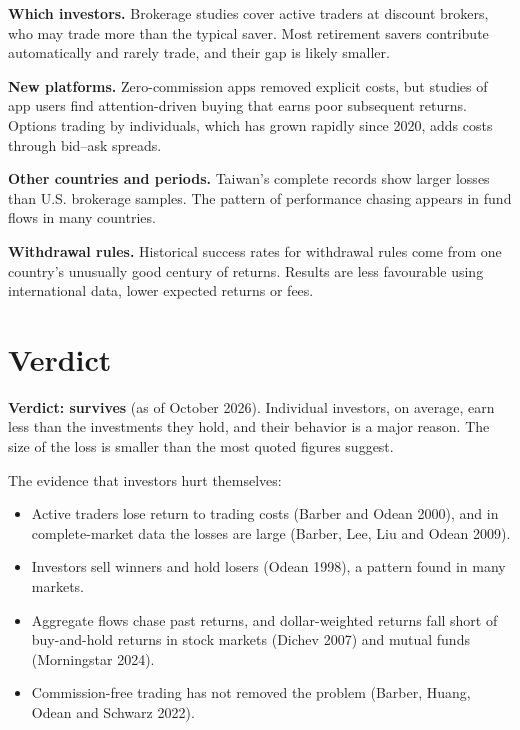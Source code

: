 \textbf{Which investors.} Brokerage studies cover active traders at discount brokers, who may trade more than the typical saver. Most retirement savers contribute automatically and rarely trade, and their gap is likely smaller.

\textbf{New platforms.} Zero-commission apps removed explicit costs, but studies of app users find attention-driven buying that earns poor subsequent returns. Options trading by individuals, which has grown rapidly since 2020, adds costs through bid--ask spreads.

\textbf{Other countries and periods.} Taiwan's complete records show larger losses than U.S. brokerage samples. The pattern of performance chasing appears in fund flows in many countries.

\textbf{Withdrawal rules.} Historical success rates for withdrawal rules come from one country's unusually good century of returns. Results are less favourable using international data, lower expected returns or fees.

\section{Verdict}
\label{sec:24-verdict}

\begin{callout}
\textbf{Verdict: survives} (as of October 2026). Individual investors, on average, earn less than the investments they hold, and their behavior is a major reason. The size of the loss is smaller than the most quoted figures suggest.
\end{callout}

The evidence that investors hurt themselves:

\begin{itemize}
  \item Active traders lose return to trading costs (Barber and Odean 2000), and in complete-market data the losses are large (Barber, Lee, Liu and Odean 2009).
  \item Investors sell winners and hold losers (Odean 1998), a pattern found in many markets.
  \item Aggregate flows chase past returns, and dollar-weighted returns fall short of buy-and-hold returns in stock markets (Dichev 2007) and mutual funds (Morningstar 2024).
  \item Commission-free trading has not removed the problem (Barber, Huang, Odean and Schwarz 2022).
\end{itemize}

